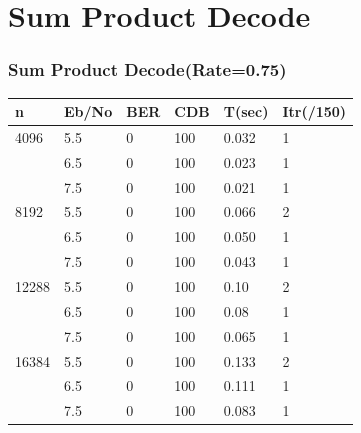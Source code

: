 \documentclass[xcolor=dvipsname]
{beamer}
\begin{document}
\section{ Sum Product Decode }
\begin{frame}[t]
\frametitle{Sum Product Decode(Rate=0.75)}
\begin{table}[]
\centering

\begin{tabular}{|l|l|l|l|l|l|}
\hline
n     & Eb/No & BER & CDB & T(sec)& Itr(/150) \\  \hline
4096  & 5.5   & 0   & 100 & 0.032 & 1   \\
      & 6.5   & 0   & 100 & 0.023 & 1   \\
      & 7.5   & 0   & 100 & 0.021 & 1   \\ \hline
8192  & 5.5   & 0   & 100 & 0.066 & 2   \\
      & 6.5   & 0   & 100 & 0.050 & 1   \\
      & 7.5   & 0   & 100 & 0.043 & 1   \\ \hline
12288 & 5.5   & 0   & 100 & 0.10  & 2   \\ 
      & 6.5   & 0   & 100 & 0.08  & 1   \\
      & 7.5   & 0   & 100 & 0.065 & 1   \\ \hline
16384 & 5.5   & 0   & 100 & 0.133 & 2   \\ 
      & 6.5   & 0   & 100 & 0.111 & 1   \\
      & 7.5   & 0   & 100 & 0.083 & 1   \\ \hline
\end{tabular}
\end{table}
\end{frame}
\end{document}
